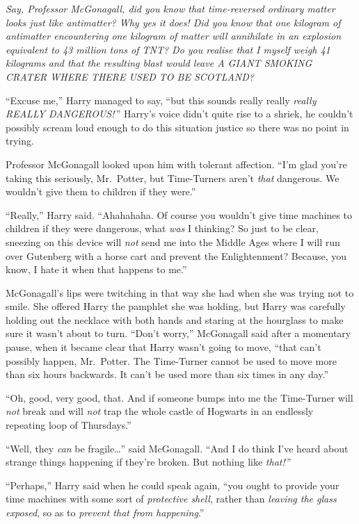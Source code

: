 \emph{Say, Professor McGonagall, did you know that time-reversed
ordinary matter looks just like antimatter? Why yes it does! Did you
know that one kilogram of antimatter encountering one kilogram of matter
will annihilate in an explosion equivalent to 43 million tons of TNT? Do
you realise that I myself weigh 41 kilograms and that the resulting
blast would leave A GIANT SMOKING CRATER WHERE THERE USED TO BE
SCOTLAND?}

``Excuse me,'' Harry managed to say, ``but this sounds really really
\emph{really REALLY DANGEROUS!} '' Harry's voice didn't quite rise to a
shriek, he couldn't possibly scream loud enough to do this situation
justice so there was no point in trying.

Professor McGonagall looked upon him with tolerant affection. ``I'm glad
you're taking this seriously, Mr.~Potter, but Time-Turners aren't
\emph{that} dangerous. We wouldn't give them to children if they were.''

``Really,'' Harry said. ``Ahahahaha. Of course you wouldn't give time
machines to children if they were dangerous, what \emph{was} I thinking?
So just to be clear, sneezing on this device will \emph{not} send me
into the Middle Ages where I will run over Gutenberg with a horse cart
and prevent the Enlightenment? Because, you know, I hate it when that
happens to me.''

McGonagall's lips were twitching in that way she had when she was trying
not to smile. She offered Harry the pamphlet she was holding, but Harry
was carefully holding out the necklace with both hands and staring at
the hourglass to make sure it wasn't about to turn. ``Don't worry,''
McGonagall said after a momentary pause, when it became clear that Harry
wasn't going to move, ``that can't possibly happen, Mr.~Potter. The
Time-Turner cannot be used to move more than six hours backwards. It
can't be used more than six times in any day.''

``Oh, good, very good, that. And if someone bumps into me the
Time-Turner will \emph{not} break and will \emph{not} trap the whole
castle of Hogwarts in an endlessly repeating loop of Thursdays.''

``Well, they \emph{can} be fragile\ldots{}'' said McGonagall. ``And I do
think I've heard about strange things happening if they're broken. But
nothing like \emph{that!''}

``Perhaps,'' Harry said when he could speak again, ``you ought to
provide your time machines with some sort of \emph{protective shell},
rather than \emph{leaving the glass exposed}, so as to \emph{prevent
that from happening}.''

